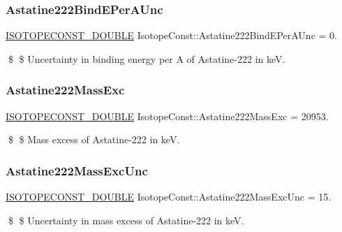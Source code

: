 \subsubsection{\texorpdfstring{Astatine222\+Bind\+E\+Per\+A\+Unc}{Astatine222BindEPerAUnc}}
{\footnotesize\ttfamily \mbox{\hyperlink{group___isotope_const-_macros_ga8f45a7272ce02c0b4c65c44636ed719a}{I\+S\+O\+T\+O\+P\+E\+C\+O\+N\+S\+T\+\_\+\+D\+O\+U\+B\+LE}} Isotope\+Const\+::\+Astatine222\+Bind\+E\+Per\+A\+Unc = 0.}

\$ \$ Uncertainty in binding energy per A of Astatine-\/222 in keV. \mbox{\label{group___isotope_const-_astatine-_at222_ga7c41b9e9ced1599f92fb84ff2dd88651}} 
\subsubsection{\texorpdfstring{Astatine222\+Mass\+Exc}{Astatine222MassExc}}
{\footnotesize\ttfamily \mbox{\hyperlink{group___isotope_const-_macros_ga8f45a7272ce02c0b4c65c44636ed719a}{I\+S\+O\+T\+O\+P\+E\+C\+O\+N\+S\+T\+\_\+\+D\+O\+U\+B\+LE}} Isotope\+Const\+::\+Astatine222\+Mass\+Exc = 20953.}

\$ \$ Mass excess of Astatine-\/222 in keV. \mbox{\label{group___isotope_const-_astatine-_at222_ga793779e397154942364b4a51865ba740}} 
\subsubsection{\texorpdfstring{Astatine222\+Mass\+Exc\+Unc}{Astatine222MassExcUnc}}
{\footnotesize\ttfamily \mbox{\hyperlink{group___isotope_const-_macros_ga8f45a7272ce02c0b4c65c44636ed719a}{I\+S\+O\+T\+O\+P\+E\+C\+O\+N\+S\+T\+\_\+\+D\+O\+U\+B\+LE}} Isotope\+Const\+::\+Astatine222\+Mass\+Exc\+Unc = 15.}

\$ \$ Uncertainty in mass excess of Astatine-\/222 in keV. \mbox{\label{group___isotope_const-_astatine-_at222_ga9d4fd1764fd00e23ab6d8aca2f3164f4}} 
